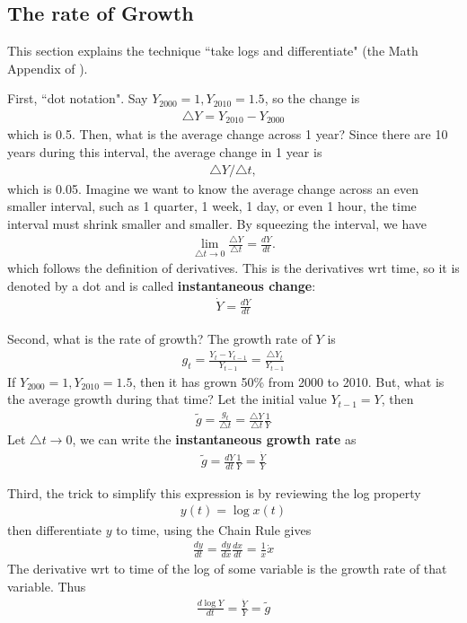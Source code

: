\documentclass[10pt,a4paper]{book}
\theoremstyle{definition}\newtheorem{definition}{Definition}
\theoremstyle{definition}\newtheorem{fact}{Fact}
\theoremstyle{definition}\newtheorem{ex}{Ex.}
\theoremstyle{definition}\newtheorem{project}{Project}
\theoremstyle{definition}\newtheorem{problem}{Problem}
\theoremstyle{definition}\newtheorem{example}{Example}
\numberwithin{theorem}{chapter}
\numberwithin{corollary}{chapter}
\numberwithin{assumption}{chapter}
\numberwithin{definition}{chapter}
\numberwithin{prop}{chapter}
\numberwithin{notation}{chapter}
\numberwithin{problem}{chapter}
\numberwithin{example}{chapter}
\numberwithin{fact}{chapter}
\numberwithin{ex}{chapter}
\begin{document}
	\subsection*{The rate of Growth}
	This section explains the technique ``take logs and differentiate" (the Math Appendix of \citet{jones2002introduction}).
	
	First, ``dot notation". Say $Y_{2000} = 1, Y_{2010} = 1.5$, so the change is
	\begin{align*}
		\triangle Y = Y_{2010} - Y_{2000} 
	\end{align*}
	which is 0.5. Then, what is the average change across 1 year? Since there are 10 years during this interval, the average change in 1 year is
	\begin{align*}
		\triangle Y /\triangle t, 
	\end{align*}
	which is 0.05. Imagine we want to know the average change across an even smaller interval, such as 1 quarter, 1 week, 1 day, or even 1 hour, the time interval must shrink smaller and smaller. By squeezing the interval, we have
	\begin{align*}
		\lim_{\triangle t \to 0} \frac{\triangle Y}{\triangle t } = \frac{dY}{dt}. 
	\end{align*}
	which follows the definition of derivatives. This is the derivatives wrt time, so it is denoted by a dot and is called \textbf{instantaneous change}:
	\begin{align*}
		\dot{Y} = \frac{dY}{dt} 
	\end{align*}
	
	Second, what is the rate of growth? The growth rate of $Y$ is
	\begin{align*}
		g_t = \frac{Y_t - Y_{t-1}}{Y_{t-1}} = \frac{\triangle Y_t}{Y_{t-1}} 
	\end{align*}
	If $Y_{2000} = 1, Y_{2010} = 1.5$, then it has grown 50\% from 2000 to 2010. But, what is the average growth during that time? Let the initial value $Y_{t-1} = Y$, then 
	\begin{align*}
		\tilde{g} = \frac{g_t}{\triangle t} = \frac{\triangle Y}{\triangle t} \frac{1}{Y} 
	\end{align*}
	Let $\triangle t \to 0$, we can write the \textbf{instantaneous growth rate} as
	\begin{align*}
		\tilde{g} = \frac{dY}{dt} \frac{1}{Y} = \frac{\dot{Y}}{Y} 
	\end{align*}
	
	Third, the trick to simplify this expression is by reviewing  the log property
	\begin{align*}
		y(t) = \log x(t) 
	\end{align*}
	then differentiate $y$ to time, using the Chain Rule gives
	\begin{align*}
		\frac{dy}{dt} = \frac{dy}{dx} \frac{dx}{dt} = \frac{1}{x} \dot{x} 
	\end{align*}
	The derivative wrt to time of the log of some variable is the growth rate of that variable. Thus
	\begin{align*}
		\frac{d \log Y}{dt} = \frac{\dot{Y}}{Y} = \tilde{g} 
	\end{align*}
	
\end{document}
